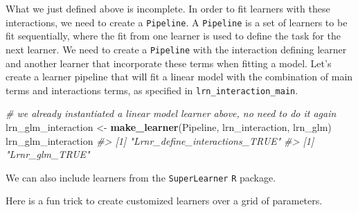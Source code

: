 \documentclass[12pt, krantz2,]{book}
\newenvironment{Shaded}{\begin{snugshade}}{\end{snugshade}}
\newcommand{\CommentTok}[1]{\textcolor[rgb]{0.56,0.35,0.01}{\textit{#1}}}
\newcommand{\KeywordTok}[1]{\textcolor[rgb]{0.13,0.29,0.53}{\textbf{#1}}}
\newcommand{\NormalTok}[1]{#1}
\newcommand{\OperatorTok}[1]{\textcolor[rgb]{0.81,0.36,0.00}{\textbf{#1}}}
\newcommand{\StringTok}[1]{\textcolor[rgb]{0.31,0.60,0.02}{#1}}
\theoremstyle{definition}
\theoremstyle{definition}
\theoremstyle{definition}
\newcommand{\1}{\mathbbm{1}}
\begin{document}
What we just defined above is incomplete. In order to fit learners with these
interactions, we need to create a \texttt{Pipeline}. A \texttt{Pipeline} is a set of learners
to be fit sequentially, where the fit from one learner is used to define the
task for the next learner. We need to create a \texttt{Pipeline} with the interaction
defining learner and another learner that incorporate these terms when fitting
a model. Let's create a learner pipeline that will fit a linear model with the
combination of main terms and interactions terms, as specified in
\texttt{lrn\_interaction\_main}.

\begin{Shaded}
\begin{Highlighting}[]
\CommentTok{# we already instantiated a linear model learner above, no need to do it again}
\NormalTok{lrn_glm_interaction <-}\StringTok{ }\KeywordTok{make_learner}\NormalTok{(Pipeline, lrn_interaction, lrn_glm)}
\NormalTok{lrn_glm_interaction}
\CommentTok{#> [1] "Lrnr_define_interactions_TRUE"}
\CommentTok{#> [1] "Lrnr_glm_TRUE"}
\end{Highlighting}
\end{Shaded}

We can also include learners from the \texttt{SuperLearner} \texttt{R} package.

\begin{Shaded}
\end{Shaded}

Here is a fun trick to create customized learners over a grid of parameters.
\end{document}
